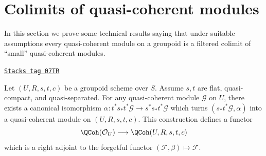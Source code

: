 \section{Colimits of quasi-coherent modules}
\label{groupoids-section-colimits}
In this section we prove some technical results saying that under
suitable assumptions every quasi-coherent module on a groupoid is
a filtered colimit of ``small'' quasi-coherent modules.

\begin{lemma}
\label{groupoids-lemma-construct-quasi-coherent}
\href{https://stacks.math.columbia.edu/tag/07TR}{\texttt{Stacks tag 07TR}}

Let $(U, R, s, t, c)$ be a groupoid scheme over $S$.
Assume $s, t$ are flat, quasi-compact, and quasi-separated.
For any quasi-coherent module $\mathcal{G}$ on $U$, there exists
a canonical isomorphism
$\alpha : t^*s_*t^*\mathcal{G} \to s^*s_*t^*\mathcal{G}$
which turns $(s_*t^*\mathcal{G}, \alpha)$ into a quasi-coherent module
on $(U, R, s, t, c)$. This construction defines a functor
$$
\QCoh(\mathcal{O}_U) \longrightarrow \QCoh(U, R, s, t, c)
$$
which is a right adjoint to the forgetful functor
$(\mathcal{F}, \beta) \mapsto \mathcal{F}$.
\end{lemma}

